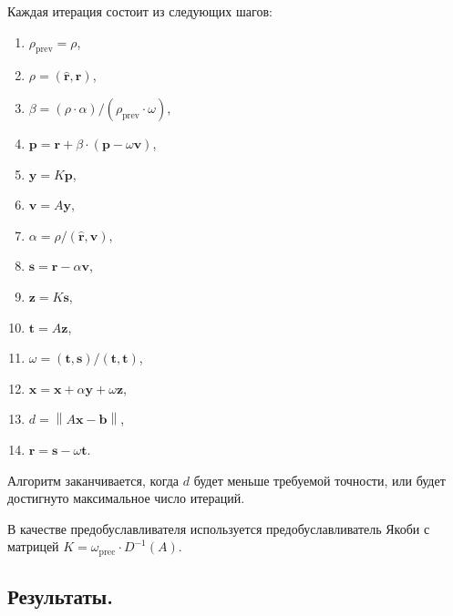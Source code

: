 \documentclass[12pt]{article}
\begin{document}
Каждая итерация состоит из следующих шагов:
\begin{enumerate}
\item $\rho_\text{prev} = \rho$,
\item $\rho = (\mathbf{\hat r}, \mathbf r)$,
\item $\beta = (\rho \cdot \alpha) / (\rho_\text{prev} \cdot \omega)$,
\item $\mathbf p = \mathbf r + \beta \cdot (\mathbf p - \omega \mathbf v)$,
\item $\mathbf y = K \mathbf p$,
\item $\mathbf v = A \mathbf y$,
\item $\alpha = \rho / (\mathbf{\hat r}, \mathbf v)$,
\item $\mathbf s = \mathbf r - \alpha \mathbf v$,
\item $\mathbf z = K \mathbf s$,
\item $\mathbf t = A \mathbf z$,
\item $\omega = (\mathbf t, \mathbf s) / (\mathbf t, \mathbf t)$,
\item $\mathbf x = \mathbf x + \alpha \mathbf y + \omega \mathbf z$,
\item $d = \left\|A \mathbf x - \mathbf b\right\|$,
\item $\mathbf r = \mathbf s - \omega \mathbf t$.
\end{enumerate}
Алгоритм заканчивается, когда $d$ будет меньше требуемой точности, или будет
достигнуто максимальное число итераций.

В качестве предобуславливателя используется предобуславливатель Якоби
с матрицей $K = \omega_\text{prec} \cdot D^{-1}(A)$.

\subsection{Результаты.}
\end{document}
